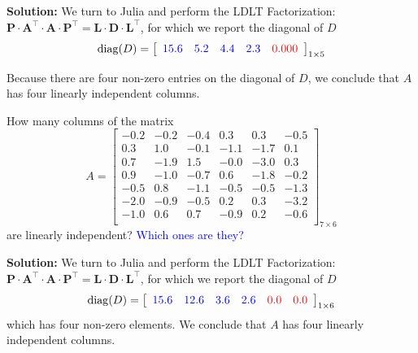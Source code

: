 \textbf{Solution:} We turn to Julia and perform the LDLT Factorization: $\mathbf{P \cdot A^\top \cdot A \cdot P^\top = L \cdot D \cdot L^\top}$, for which we report the diagonal of $D$
\begin{equation}
{\rm diag}(D) = \left[
\begin{array}{ccccc}
\color{blue} 15.6 & \color{blue} 5.2 & \color{blue} 4.4 & \color{blue} 2.3 & \color{red} 0.000 \end{array}
\right]_{1 \times 5}
\end{equation}

Because there are four non-zero entries on the diagonal of $D$,  we conclude that $A$ has four linearly independent columns.
\Qed


\vspace*{.5cm}

\begin{example} 
\label{ex:SemiProtip02} How many columns of the matrix 
\begin{equation}
A=\left[
\begin{array}{rrrrrr}
-0.2 & -0.2 & -0.4 & 0.3 & 0.3 & -0.5 \\
0.3 & 1.0 & -0.1 & -1.1 & -1.7 & 0.1 \\
0.7 & -1.9 & 1.5 & -0.0 & -3.0 & 0.3 \\
0.9 & -1.0 & -0.7 & 0.6 & -1.8 & -0.2 \\
-0.5 & 0.8 & -1.1 & -0.5 & -0.5 & -1.3 \\
-2.0 & -0.9 & -0.5 & 0.2 & 0.3 & -3.2 \\
-1.0 & 0.6 & 0.7 & -0.9 & 0.2 & -0.6 \\
\end{array}
\right]_{7\times 6}
\end{equation}
are linearly independent? \textcolor{blue}{Which ones are they?} 
\end{example}

\vspace*{0.2cm}

\textbf{Solution:}  We turn to Julia and perform the LDLT Factorization: $\mathbf{P \cdot A^\top \cdot A \cdot P^\top = L \cdot D \cdot L^\top}$, for which we report the diagonal of $D$
\begin{equation}
{\rm diag}(D)=\left[
\begin{array}{cccccc}
\color{blue}  15.6 & \color{blue}  12.6 & \color{blue}  3.6 & \color{blue}  2.6  & \color{red} 0.0 & \color{red} 0.0 
\end{array}
\right]_{1\times 6}
\end{equation}
which has four non-zero elements. We conclude that $A$ has four linearly independent columns. \\

